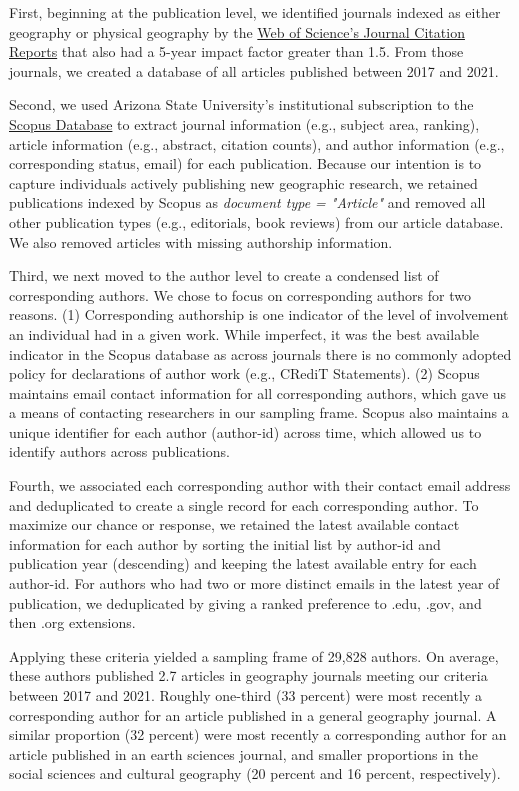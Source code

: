 \documentclass[]{interact}
\theoremstyle{plain}%
\theoremstyle{definition}
\theoremstyle{remark}
\begin{document}
First, beginning at the publication level, we identified journals indexed as either geography or physical geography by the \href{https://access.clarivate.com/}{Web of Science's Journal Citation Reports} that also had a 5-year impact factor greater than 1.5.
From those journals, we created a database of all articles published between 2017 and 2021.  

Second, we used Arizona State University's institutional subscription to the \href{https://www.scopus.com/home.uri}{Scopus Database} to extract journal information (e.g., subject area, ranking), article information (e.g., abstract, citation counts), and author information (e.g., corresponding status, email) for each publication. 
Because our intention is to capture individuals actively publishing new geographic research, we retained publications indexed by Scopus as \textit{document type = "Article"} and removed all other publication types (e.g., editorials, book reviews) from our article database. 
We also removed articles with missing authorship information. 

Third, we next moved to the author level to create a condensed list of corresponding authors. 
We chose to focus on corresponding authors for two reasons. 
(1) Corresponding authorship is one indicator of the level of involvement an individual had in a given work. 
While imperfect, it was the best available indicator in the Scopus database as across journals there is no commonly adopted policy for declarations of author work (e.g., CRediT Statements).
(2) Scopus maintains email contact information for all corresponding authors, which gave us a means of contacting researchers in our sampling frame.
Scopus also maintains a unique identifier for each author (author-id) across time, which allowed us to identify authors across publications. 

Fourth, we associated each corresponding author with their contact email address and deduplicated to create a single record for each corresponding author. 
To maximize our chance or response, we retained the latest available contact information for each author by sorting the initial list by author-id and publication year (descending) and keeping the latest available entry for each author-id. 
For authors who had two or more distinct emails in the latest year of publication, we deduplicated by giving a ranked preference to .edu, .gov, and then .org extensions.

Applying these criteria yielded a sampling frame of 29,828 authors. 
On average, these authors published 2.7 articles in geography journals meeting our criteria between 2017 and 2021. 
Roughly one-third (33 percent) were most recently a corresponding author for an article published in a general geography journal. 
A similar proportion (32 percent) were most recently a corresponding author for an article published in an earth sciences journal, and smaller proportions in the social sciences and cultural geography (20 percent and 16 percent, respectively).
\end{document}
